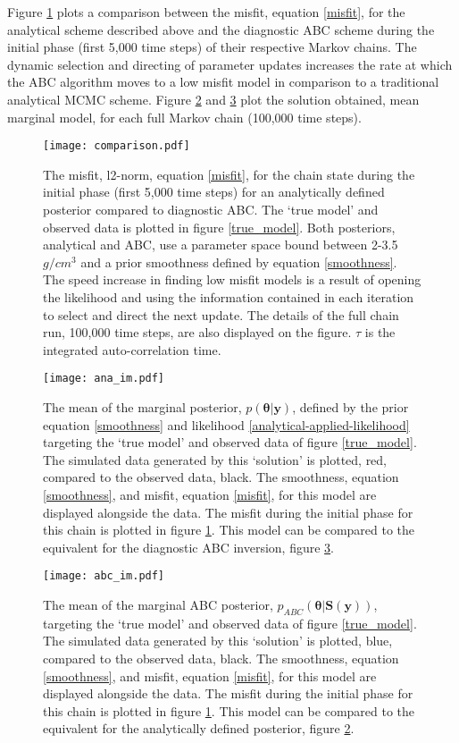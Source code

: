 Figure \ref{comparison-1} plots a comparison between the misfit, equation \ref{misfit}, for the analytical scheme described above and the diagnostic ABC scheme during the initial phase (first 5,000 time steps) of their respective Markov chains. The dynamic selection and directing of parameter updates increases the rate at which the ABC algorithm moves to a low misfit model in comparison to a traditional analytical MCMC scheme. Figure \ref{ana-im-1} and \ref{abc-im-1} plot the solution obtained, mean marginal model, for each full Markov chain (100,000 time steps).\par

\begin{figure}[H]
	\centering
	\texttt{[image: comparison.pdf]}
	\caption{The misfit, l2-norm, equation \ref{misfit}, for the chain state during the initial phase (first 5,000 time steps) for an analytically defined posterior compared to diagnostic ABC. The `true model' and observed data is plotted in figure \ref{true_model}. Both posteriors, analytical and ABC, use a parameter space bound between 2-3.5 $g/cm^3$ and a prior smoothness defined by equation \ref{smoothness}. The speed increase in finding low misfit models is a result of opening the likelihood and using the information contained in each iteration to select and direct the next update. The details of the full chain run, 100,000 time steps, are also displayed on the figure. $\tau$ is the integrated auto-correlation time.}
	\label{comparison-1}
\end{figure}

\begin{figure}[H]
	\centering
	\texttt{[image: ana\_im.pdf]}
	\caption{The mean of the marginal posterior, $p(\bm{\theta}|\bm{y})$, defined by the prior equation \ref{smoothness} and likelihood \ref{analytical-applied-likelihood} targeting the `true model' and observed data of figure \ref{true_model}. The simulated data generated by this `solution' is plotted, red, compared to the observed data, black. The smoothness, equation \ref{smoothness}, and misfit, equation \ref{misfit}, for this model are displayed alongside the data. The misfit during the initial phase for this chain is plotted in figure \ref{comparison-1}. This model can be compared to the equivalent for the diagnostic ABC inversion, figure \ref{abc-im-1}.}
	\label{ana-im-1}
\end{figure}

\begin{figure}[H]
	\centering
	\texttt{[image: abc\_im.pdf]}
	\caption{The mean of the marginal ABC posterior, $p_{ABC}(\bm{\theta}|\bm{S}(\bm{y}))$, targeting the `true model' and observed data of figure \ref{true_model}. The simulated data generated by this `solution' is plotted, blue, compared to the observed data, black. The smoothness, equation \ref{smoothness}, and misfit, equation \ref{misfit}, for this model are displayed alongside the data. The misfit during the initial phase for this chain is plotted in figure \ref{comparison-1}. This model can be compared to the equivalent for the analytically defined posterior, figure \ref{ana-im-1}.}
	\label{abc-im-1}
\end{figure}


